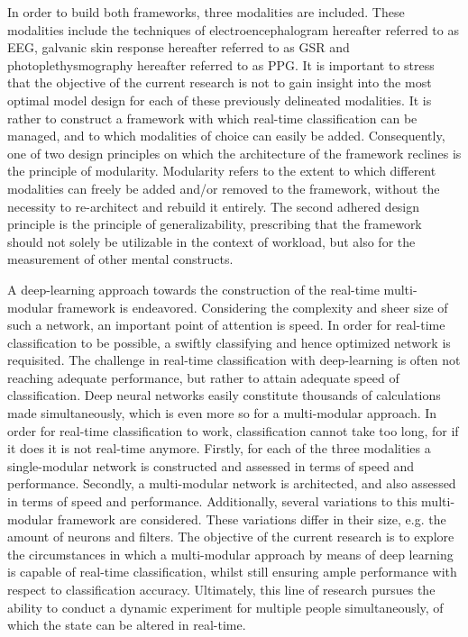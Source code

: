 \documentclass[12pt]{article}
\begin{document}
In order to build both frameworks, three modalities are included. These modalities include the techniques of electroencephalogram hereafter referred to as EEG, galvanic skin response hereafter referred to as GSR and photoplethysmography hereafter referred to as PPG. It is important to stress that the objective of the current research is not to gain insight into the most optimal model design for each of these previously delineated modalities. It is rather to construct a framework with which real-time classification can be managed, and to which modalities of choice can easily be added. Consequently, one of two design principles on which the architecture of the framework reclines is the principle of modularity. Modularity refers to the extent to which different modalities can freely be added and/or removed to the framework, without the necessity to re-architect and rebuild it entirely. The second adhered design principle is the principle of generalizability, prescribing that the framework should not solely be utilizable in the context of workload, but also for the measurement of other mental constructs.

A deep-learning approach towards the construction of the real-time multi-modular framework is endeavored. Considering the complexity and sheer size of such a network, an important point of attention is speed. In order for real-time classification to be possible, a swiftly classifying and hence optimized network is requisited. The challenge in real-time classification with deep-learning is often not reaching adequate performance, but rather to attain adequate speed of classification. Deep neural networks easily constitute thousands of calculations made simultaneously, which is even more so for a multi-modular approach. In order for real-time classification to work, classification cannot take too long, for if it does it is not real-time anymore. Firstly, for each of the three modalities a single-modular network is constructed and assessed in terms of speed and performance. Secondly, a multi-modular network is architected, and also assessed in terms of speed and performance. Additionally, several variations to this multi-modular framework are considered. These variations differ in their size, e.g. the amount of neurons and filters. The objective of the current research is to explore the circumstances in which a multi-modular approach by means of deep learning is capable of real-time classification, whilst still ensuring ample performance with respect to classification accuracy. Ultimately, this line of research pursues the ability to conduct a dynamic experiment for multiple people simultaneously, of which the state can be altered in real-time. 
\end{document}
